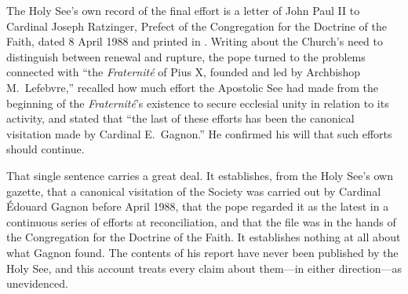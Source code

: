 The Holy See's own record of the final effort is a letter of John Paul II
to Cardinal Joseph Ratzinger, Prefect of the Congregation for the
Doctrine of the Faith, dated 8 April 1988 and printed in . Writing about the Church's need to distinguish
between renewal and rupture, the pope turned to the problems connected
with ``the \textit{Fraternité} of Pius X, founded and led by Archbishop
M.~Lefebvre,'' recalled how much effort the Apostolic See had made from
the beginning of the \textit{Fraternité}'s existence to secure ecclesial
unity in relation to its activity, and stated that ``the last of these
efforts has been the canonical visitation made by Cardinal E.~Gagnon.''
He confirmed his will that such efforts should continue.

That single sentence carries a great deal. It establishes, from the Holy
See's own gazette, that a canonical visitation of the Society was carried
out by Cardinal Édouard Gagnon before April 1988, that the pope regarded
it as the latest in a continuous series of efforts at reconciliation, and
that the file was in the hands of the Congregation for the Doctrine of
the Faith. It establishes nothing at all about what Gagnon found. The
contents of his report have never been published by the Holy See, and
this account treats every claim about them---in either
direction---as unevidenced.

\begin{documentinventory}
\end{documentinventory}
